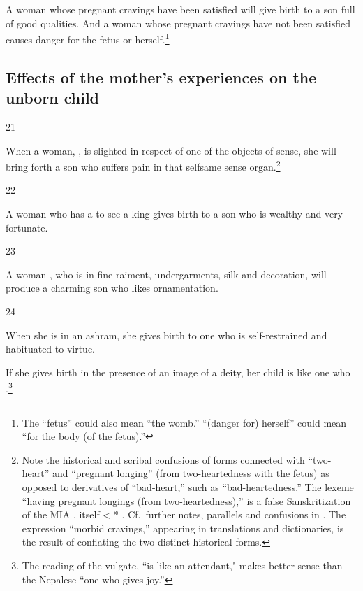 \begin{translation}
A woman whose pregnant cravings have been satisfied will give birth to
a son full of good qualities.  And a woman whose pregnant cravings
have not been satisfied causes danger for the fetus or
herself.\footnote{The  “fetus” could also mean “the womb.”
     “(danger for) herself” could mean “for the body (of the
    fetus).”}
    
\subsection{Effects of the mother's experiences on the unborn child}
  
\item[21]

When a woman, , is
slighted in respect of one of the objects of sense, she will bring
forth a son who suffers pain in that selfsame sense
organ.\footnote{Note the historical and scribal confusions of forms
    connected with  “two-heart” and  “pregnant
    longing” (from two-heartedness with the fetus) as opposed to
    derivatives of   “bad-heart,” such as 
    “bad-heartedness.”    The lexeme  “having pregnant
    longings (from two-heartedness),” is a  false Sanskritization of the
    MIA , itself < * \citep[46, 183
    n.\,2]{lued-1940}. Cf.\ further notes, parallels and confusions in
    \cite[\#6690]{CDIAL}.  The expression  “morbid cravings,” appearing in
    translations and dictionaries, is the result of conflating the two
    distinct historical forms.}
    
    \item [22]
   
A woman who has a  to see a king gives
birth to a son who is wealthy and very fortunate.
    
\item[23]

A woman , who is in 
fine raiment, undergarments, silk and decoration, 
will produce a charming son who likes ornamentation. 

\item[24]

When she is in an ashram, she gives birth to one who is self-restrained and 
habituated to virtue. 

If she gives birth in the presence of an image of a deity, her child
is like one who .\footnote{The reading of the vulgate,
     “is like an attendant," makes better sense than the
    Nepalese  “one who gives joy.”}


\end{translation}
